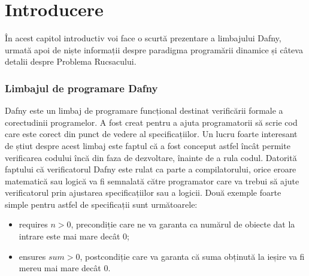 \chapter*{Introducere} 

\begin{sloppypar}
În acest capitol introductiv voi face o scurtă prezentare a limbajului Dafny, urmată apoi de niște informații despre paradigma programării dinamice și câteva detalii despre Problema Rucsacului.

\subsection*{Limbajul de programare Dafny}
Dafny este un limbaj de programare funcțional destinat verificării formale a corectudinii programelor. A fost creat pentru a ajuta programatorii să scrie cod care este corect din punct de vedere al specificațiilor. Un lucru foarte interesant de știut despre acest limbaj este faptul că a fost conceput astfel încât permite verificarea codului încă din faza de dezvoltare, înainte de a rula codul. Datorită faptului că verificatorul Dafny este rulat ca parte a compilatorului, orice eroare matematică sau logică va fi semnalată către programator care va trebui să ajute verificatorul prin ajustarea specificațiilor sau a logicii. Două exemple foarte simple pentru astfel de specificații sunt următoarele:
\begin{itemize}
    \item requires \( n > 0 \), precondiție care ne va garanta ca numărul de obiecte dat la intrare este mai mare decât 0;
    \item ensures \(sum >  0\), postcondiție care va garanta că suma obținută la ieșire va fi mereu mai mare decât 0.
\end{itemize}


\end{sloppypar}

